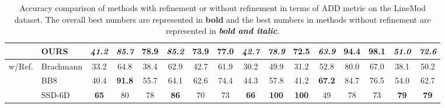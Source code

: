 \documentclass[10pt,twocolumn,letterpaper]{article}
\begin{document}
\begin{table*}[t]
{\begin{tabular}{ll|c|c|c|c|c|c|c|c|c|c|c|c|c|c}
\multicolumn{1}{c|}{}                         & OURS      & \textit{\textbf{41.2} }                    & \textit{\textbf{85.7} }                          & \textbf{78.9}                     & \textit{\textbf{85.2}}                     & \textbf{73.9}                     & \textbf{77.0}                         & \textit{\textbf{42.7}}                      & \textit{\textbf{78.9}}                        & 72.5                      & \textit{\textbf{63.9}}                             & \textbf{94.4}                      & \textbf{98.1}                      & \textit{\textbf{51.0}}                       & \textbf{\textit{72.6}}                        \\ \hline
\multicolumn{1}{l|}{\multirow{3}{*}{w/Ref.}} & Brachmann \cite{7780735}& 33.2                     & 64.8                           & 38.4                     & 62.9                     & 42.7                     & 61.9                         & 30.2                      & 49.9                        & 31.2                      & 52.8                             & 80.0                      & 67.0                      & 38.1                       & 50.2                        \\
\multicolumn{1}{l|}{}                         & BB8 \cite{Rad2017BB8AS}       & 40.4                     & \textbf{91.8}                           & 55.7                     & 64.1                     & 62.6                     & 74.4                         & 44.3                      & 57.8                        & 41.2                      & \textbf{67.2}                             & 84.7                      & 76.5                      & 54.0                       & 62.7                        \\
\multicolumn{1}{l|}{}                         & SSD-6D \cite{Kehl2017SSD6DMR}    & \textbf{65}                       & 80                             & 78                       & \textbf{86}                       & 70                       & 73                           & \textbf{66}                        & \textbf{100}                         & \textbf{100}                       & 49                               & 78    & 73 & \textbf{79}                         & \textbf{79}
\end{tabular}}
\caption{Accuracy comparison of methods with refinement or without refinement in terms of ADD metric on the LineMod dataset. The overall best numbers are represented in \textbf{bold} and the best numbers in methods without refinement are represented in \textbf{\textit{bold and italic}}.}
\label{tb:ADD}
\end{table*}
\end{document}
